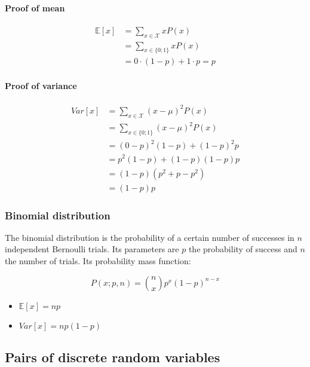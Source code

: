 		\begin{multicols}{2}
			\paragraph{Proof of mean}
			
			\begin{align*}
				\mathbb{E}[x] &= \sum\limits_{x\in\mathcal{X}} xP(x)\\
				      	& = \sum\limits_{x\in\{0;1\}}xP(x)\\
				      	&= 0\cdot(1-p) + 1\cdot p = p
			\end{align*}
	
			\paragraph{Proof of variance}
	
			\begin{align*}
				Var[x] &=\sum\limits_{x\in\mathcal{X}} (x-\mu)^2P(x)\\
			       	&=\sum\limits_{x\in\{0;1\}} (x-\mu)^2P(x)\\
			       	&=(0-p)^2(1-p)+(1-p)^2p\\
			       	&=p^2(1-p)+(1-p)(1-p)p\\
			       	&=(1-p)(p^2+p-p^2)\\
			       	&=(1-p)p
			\end{align*}
		\end{multicols}

		\subsubsection{Binomial distribution}
		The binomial distribution is the probability of a certain number of successes in $n$ independent Bernoulli trials.
		Its parameters are $p$ the probability of success and $n$ the number of trials.
		Its probability mass function:

		$$P(x;p,n) = \binom{n}{x}p^x(1-p)^{n-x}$$

		\begin{multicols}{2}
			\begin{itemize}
				\item $\mathbb{E}[x] = np$
				\item $Var[x] = np(1-p)$
			\end{itemize}
		\end{multicols}

	\subsection{Pairs of discrete random variables}
	
